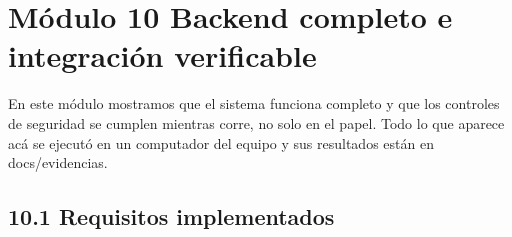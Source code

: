 \documentclass[10pt,letterpaper]{article}
\begin{document}
\section*{Módulo 10 Backend completo e integración verificable}
En este módulo mostramos que el sistema funciona completo y que los controles de seguridad se cumplen mientras corre, no solo en el papel. Todo lo que aparece acá se ejecutó en un computador del equipo y sus resultados están en docs/\allowbreak{}evidencias.


\subsection*{10.1 Requisitos implementados}
\end{document}
